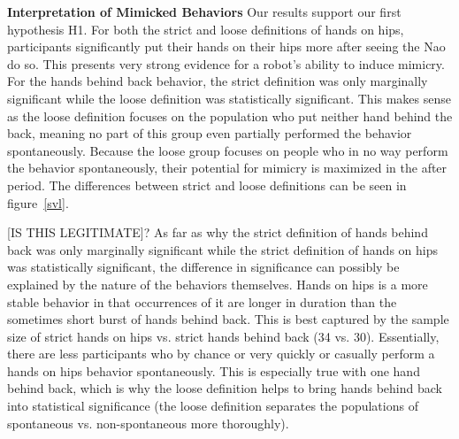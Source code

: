\documentclass{acm_proc_article-sp}
\begin{document}
\textbf{Interpretation of Mimicked Behaviors} Our results support our first hypothesis H1. For both the strict and loose definitions of hands on hips, participants significantly put their hands on their hips more after seeing the Nao do so. This presents very strong evidence for a robot's ability to induce mimicry. For the hands behind back behavior, the strict definition was only marginally significant while the loose definition was statistically significant. This makes sense as the loose definition focuses on the population who put neither hand behind the back, meaning no part of this group even partially performed the behavior spontaneously. Because the loose group focuses on people who in no way perform the behavior spontaneously, their potential for mimicry is maximized in the after period. The differences between strict and loose definitions can be seen in figure~\ref{svl}.

[IS THIS LEGITIMATE]? As far as why the strict definition of hands behind back was only marginally significant while the strict definition of hands on hips was statistically significant, the difference in significance can possibly be explained by the nature of the behaviors themselves. Hands on hips is a more stable behavior in that occurrences of it are longer in duration than the sometimes short burst of hands behind back. This is best captured by the sample size of strict hands on hips vs. strict hands behind back (34 vs. 30). Essentially, there are less participants who by chance or very quickly or casually perform a hands on hips behavior spontaneously. This is especially true with one hand behind back, which is why the loose definition helps to bring hands behind back into statistical significance (the loose definition separates the populations of spontaneous vs. non-spontaneous more thoroughly).
\end{document}
